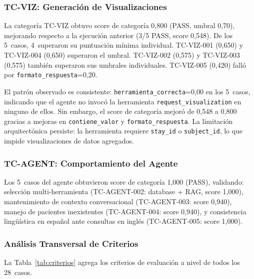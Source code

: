 \documentclass[11pt,a4paper,twocolumn]{article}
\begin{document}
\subsubsection{TC-VIZ: Generaci\'{o}n de Visualizaciones}

La categor\'{i}a TC-VIZ obtuvo score de categor\'{i}a 0,800 (PASS, umbral 0,70), mejorando respecto a la ejecuci\'{o}n anterior (3/5 PASS, score 0,548). De los 5~casos, 4~superaron su puntuaci\'{o}n m\'{i}nima individual. TC-VIZ-001 (0,650) y TC-VIZ-004 (0,650) superaron el umbral. TC-VIZ-002 (0,575) y TC-VIZ-003 (0,575) tambi\'{e}n superaron sus umbrales individuales. TC-VIZ-005 (0,420) fall\'{o} por \texttt{formato\_respuesta}=0,20.

\begin{tcolorbox}[
  colback=layerbg4, colframe=accent!60,
  title={\footnotesize\bfseries An\'{a}lisis del comportamiento TC-VIZ},
  fonttitle=\color{white}, coltitle=white,
  fontupper=\footnotesize, breakable
]
El patr\'{o}n observado es consistente: \texttt{herramienta\_correcta}=0,00 en los 5~casos, indicando que el agente no invoc\'{o} la herramienta \texttt{request\_visualization} en ninguno de ellos. Sin embargo, el score de categor\'{i}a mejor\'{o} de 0,548 a 0,800 gracias a mejoras en \texttt{contiene\_valor} y \texttt{formato\_respuesta}. La limitaci\'{o}n arquitect\'{o}nica persiste: la herramienta requiere \texttt{stay\_id} o \texttt{subject\_id}, lo que impide visualizaciones de datos agregados.
\end{tcolorbox}

\subsubsection{TC-AGENT: Comportamiento del Agente}

Los 5~casos del agente obtuvieron score de categor\'{i}a 1,000 (PASS), validando: selecci\'{o}n multi-herramienta (TC-AGENT-002: database + RAG, score 1,000), mantenimiento de contexto conversacional (TC-AGENT-003: score 0,940), manejo de pacientes inexistentes (TC-AGENT-004: score 0,940), y consistencia ling\"{u}\'{i}stica en espa\~{n}ol ante consultas en ingl\'{e}s (TC-AGENT-005: score 1,000).

\subsubsection{An\'{a}lisis Transversal de Criterios}

La Tabla~\ref{tab:criterios} agrega los criterios de evaluaci\'{o}n a nivel de todos los 28~casos.
\end{document}
